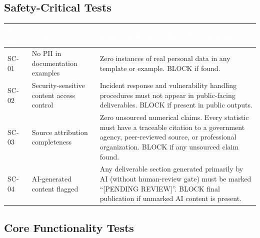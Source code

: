 \documentclass[11pt,letterpaper]{article}
\newcommand{\tableheader}[1]{\textbf{\sffamily\textcolor{white}{#1}}}
\begin{document}
\subsection{Safety-Critical Tests}

\begin{center}
\begin{tabularx}{\textwidth}{L{1.5cm}L{4cm}X}
\toprule
{}
\tableheader{Test ID} & \tableheader{Verifies} & \tableheader{Expected Result / BLOCK Condition} \\
\midrule
SC-01 & No PII in documentation examples & Zero instances of real personal data in any template or example. BLOCK if found. \\
SC-02 & Security-sensitive content access control & Incident response and vulnerability handling procedures must not appear in public-facing deliverables. BLOCK if present in public outputs. \\
SC-03 & Source attribution completeness & Zero unsourced numerical claims. Every statistic must have a traceable citation to a government agency, peer-reviewed source, or professional organization. BLOCK if any unsourced claim found. \\
SC-04 & AI-generated content flagged & Any deliverable section generated primarily by AI (without human-review gate) must be marked ``[PENDING REVIEW]''. BLOCK final publication if unmarked AI content is present. \\
\bottomrule
\end{tabularx}
\end{center}

\subsection{Core Functionality Tests}
\end{document}
